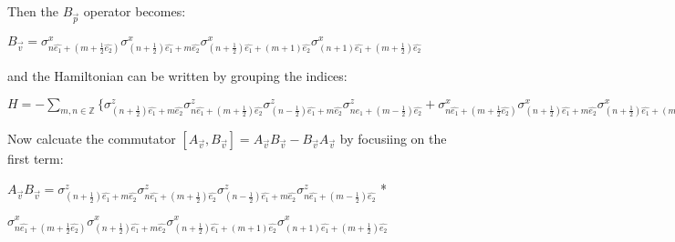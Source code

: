 \documentclass[12pt]{report}
\begin{document}
	\begin{minipage}{1\textwidth}
		
		Then the $B_{\vec{p}}$ operator becomes:
		
		\begin{center}
			
			$B_{\vec{v}} = \sigma^x_{n\hat{e_1} + (m+\frac{1}{2}\hat{e_2})} \sigma^x_{(n+ \frac{1}{2})\hat{e_1} + m\hat{e_2}} \sigma^x_{(n+ \frac{1}{2})\hat{e_1} + (m + 1)\hat{e_2}} \sigma^x_{(n+ 1)\hat{e_1} + (m + \frac{1}{2})\hat{e_2}}$\newline
			
		\end{center}
		
		
		
		and the Hamiltonian can be written by grouping the indices:\newline
		
		\begin{center}
			
			$H = - \sum_{m,n \in \mathbb{Z}} \{ 
			\sigma^z_{(n+\frac{1}{2})\hat{e_1} + m\hat{e_2}} \sigma^z_{n\hat{e_1}+(m+\frac{1}{2})\hat{e_2}} \sigma^z_{(n-\frac{1}{2})\hat{e_1} + m\hat{e_2}} \sigma^z_{n\hat{e_1}+(m-\frac{1}{2})\hat{e_2}} +
			\sigma^x_{n\hat{e_1} + (m+\frac{1}{2}\hat{e_2})} \sigma^x_{(n+ \frac{1}{2})\hat{e_1} + m\hat{e_2}} \sigma^x_{(n+ \frac{1}{2})\hat{e_1} + (m + 1)\hat{e_2}} \sigma^x_{(n+ 1)\hat{e_1} + (m + \frac{1}{2})\hat{e_2}} \} $
			
		\end{center}
		
		Now calcuate the commutator $[A_{\vec{v}},B_{\vec{v}}] = A_{\vec{v}}B_{\vec{v}} - B_{\vec{v}}A_{\vec{v}}$ by focusiing on the first term:\newline
		
		\begin{center}
			
			$ A_{\vec{v}}B_{\vec{v}} =
			\sigma^z_{(n+\frac{1}{2})\hat{e_1} + m\hat{e_2}} \sigma^z_{n\hat{e_1}+(m+\frac{1}{2})\hat{e_2}} \sigma^z_{(n-\frac{1}{2})\hat{e_1} + m\hat{e_2}} \sigma^z_{n\hat{e_1}+(m-\frac{1}{2})\hat{e_2}} $ *
			
			$\sigma^x_{n\hat{e_1} + (m+\frac{1}{2}\hat{e_2})} \sigma^x_{(n+ \frac{1}{2})\hat{e_1} + m\hat{e_2}} \sigma^x_{(n+ \frac{1}{2})\hat{e_1} + (m + 1)\hat{e_2}} \sigma^x_{(n+ 1)\hat{e_1} + (m + \frac{1}{2})\hat{e_2}}$\newline
			
		\end{center}
		

\end{minipage}
\end{document}

